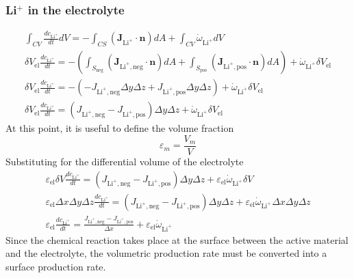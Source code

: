 \documentclass[12pt]{article}
\begin{document}
		\subsubsection{Li$^+$ in the electrolyte} 
			\begin{gather}
				\int_{CV} \frac{dc_{\text{Li}^+}}{dt} dV = -\int_{CS} (\mathbf{J}_{\text{Li}^+} \cdot \mathbf{n}) dA + \int_{CV} \dot{\omega}_{\text{Li}^+} dV\\
				\delta V_\text{el} \frac{dc_{\text{Li}^+}}{dt} = -\left(\int_{S_\text{neg}} (\mathbf{J}_{\text{Li}^+,\text{neg}} \cdot \mathbf{n}) dA + \int_{S_\text{pos}} (\mathbf{J}_{\text{Li}^+,\text{pos}} \cdot \mathbf{n}) dA\right) +  \dot{\omega}_{\text{Li}^+} \delta V_\text{el}\\
				\delta V_\text{el} \frac{dc_{\text{Li}^+}}{dt} = -\left( -J_{\text{Li}^+,\text{neg}} \Delta y \Delta z + J_{\text{Li}^+,\text{pos}}\Delta y \Delta z \right) +  \dot{\omega}_{\text{Li}^+} \delta V_\text{el}\\
				\delta V_\text{el} \frac{dc_{\text{Li}^+}}{dt} = \left( J_{\text{Li}^+,\text{neg}} - J_{\text{Li}^+,\text{pos}} \right)\Delta y \Delta z +  \dot{\omega}_{\text{Li}^+} \delta V_\text{el}
			\end{gather}
			At this point, it is useful to define the volume fraction
			\begin{equation}
				\varepsilon_m = \frac{V_m}{V}
			\end{equation}
			Substituting for the differential volume of the electrolyte
			\begin{gather}
				\varepsilon_{\text{el}} \delta V \frac{dc_{\text{Li}^+}}{dt} = \left( J_{\text{Li}^+,\text{neg}} - J_{\text{Li}^+,\text{pos}} \right)\Delta y \Delta z + \varepsilon_{\text{el}} \dot{\omega}_{\text{Li}^+}  \delta V\\
				\varepsilon_{\text{el}} \Delta x \Delta y \Delta z \frac{dc_{\text{Li}^+}}{dt} = \left( J_{\text{Li}^+,\text{neg}} - J_{\text{Li}^+,\text{pos}} \right)\Delta y \Delta z + \varepsilon_{\text{el}} \dot{\omega}_{\text{Li}^+}  \Delta x \Delta y \Delta z\\
				\varepsilon_{\text{el}}  \frac{dc_{\text{Li}^+}}{dt} = \frac{ J_{\text{Li}^+,\text{neg}} - J_{\text{Li}^+,\text{pos}} }{\Delta x} + \varepsilon_{\text{el}} \dot{\omega}_{\text{Li}^+} 
			\end{gather}
			Since the chemical reaction takes place at the surface between the active material and the electrolyte, the volumetric production rate must be converted into a surface production rate.
\end{document}
